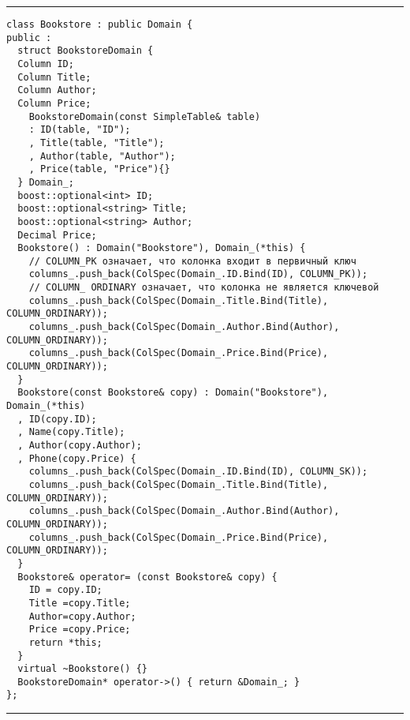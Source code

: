 \hrule

\vspace*{6pt}

\begin{verbatim}
class Bookstore : public Domain {
public :
  struct BookstoreDomain {
  Column ID;
  Column Title;
  Column Author;
  Column Price;
    BookstoreDomain(const SimpleTable& table)
    : ID(table, "ID");
    , Title(table, "Title");
    , Author(table, "Author");
    , Price(table, "Price"){}
  } Domain_;
  boost::optional<int> ID;
  boost::optional<string> Title;
  boost::optional<string> Author;
  Decimal Price;
  Bookstore() : Domain("Bookstore"), Domain_(*this) {
    // COLUMN_PK означает, что колонка входит в первичный ключ
    columns_.push_back(ColSpec(Domain_.ID.Bind(ID), COLUMN_PK));
    // COLUMN_ ORDINARY означает, что колонка не является ключевой
    columns_.push_back(ColSpec(Domain_.Title.Bind(Title), COLUMN_ORDINARY));
    columns_.push_back(ColSpec(Domain_.Author.Bind(Author), 
COLUMN_ORDINARY));
    columns_.push_back(ColSpec(Domain_.Price.Bind(Price), COLUMN_ORDINARY));
  }
  Bookstore(const Bookstore& copy) : Domain("Bookstore"), Domain_(*this)
  , ID(copy.ID);
  , Name(copy.Title);
  , Author(copy.Author);
  , Phone(copy.Price) {
    columns_.push_back(ColSpec(Domain_.ID.Bind(ID), COLUMN_SK));
    columns_.push_back(ColSpec(Domain_.Title.Bind(Title), COLUMN_ORDINARY));
    columns_.push_back(ColSpec(Domain_.Author.Bind(Author), 
COLUMN_ORDINARY));
    columns_.push_back(ColSpec(Domain_.Price.Bind(Price), COLUMN_ORDINARY));
  }
  Bookstore& operator= (const Bookstore& copy) {
    ID = copy.ID;
    Title =copy.Title;
    Author=copy.Author;
    Price =copy.Price;
    return *this;
  }
  virtual ~Bookstore() {}
  BookstoreDomain* operator->() { return &Domain_; }
};
\end{verbatim}

\vspace*{6pt}

\hrule

